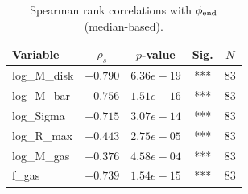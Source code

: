 \begin{table}[htbp]
\centering
\caption{Spearman rank correlations with $\phi_{\rm end}$ (median-based).}
\label{tab:correlations}
\begin{tabular}{lcccc}
\hline
Variable & $\rho_s$ & $p$-value & Sig. & $N$ \\
\hline
log\_M\_disk & $-0.790$ & $6.36e-19$ & *** & 83 \\
log\_M\_bar & $-0.756$ & $1.51e-16$ & *** & 83 \\
log\_Sigma & $-0.715$ & $3.07e-14$ & *** & 83 \\
log\_R\_max & $-0.443$ & $2.75e-05$ & *** & 83 \\
log\_M\_gas & $-0.376$ & $4.58e-04$ & *** & 83 \\
f\_gas & $+0.739$ & $1.54e-15$ & *** & 83 \\
\hline
\end{tabular}
\end{table}
